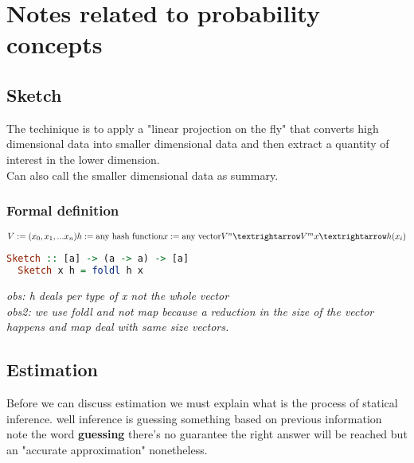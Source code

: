 \section{Notes related to probability concepts}

\subsection{Sketch}

The techinique is to apply a "linear projection on the fly" that converts high dimensional data into smaller dimensional data and then extract a quantity of interest
\cite{10-jhu1} in the lower dimension.
\\
Can also call the smaller dimensional data as summary.

\subsubsection{Formal definition}

\begin{math}
	V:=(x_0,x_1,...x_n)
	\\
	h:=\text{any hash function}
	\\
	x:=\text{any vector}
	\\\\
	V^n → V^m
	\\
	x →  h(x_i)
	\\
\end{math}

\begin{lstlisting}[language=Haskell]
  Sketch :: [a] -> (a -> a) -> [a]
  Sketch x h = foldl h x
  \end{lstlisting}
\textit{obs: h deals per type of x not the whole vector}
\\
\textit{obs2: we use foldl and not map because a reduction in the size of the vector happens and map deal with same size vectors.}
\cite{hemmanga}

\subsection{Estimation}

Before we can discuss estimation we must explain what is the process of statical inference. well inference is guessing something based on previous information
\\
note the word \textbf{guessing} there's no guarantee the right answer will be reached but an "accurate approximation" nonetheless.

